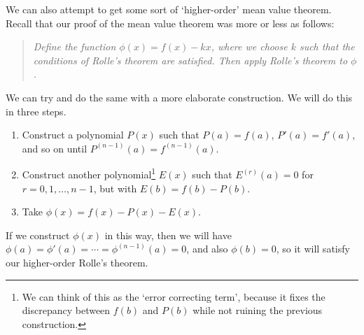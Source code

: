 \documentclass[a4paper]{scrartcl}
\begin{document}
We can also attempt to get some sort of `higher-order' mean value theorem. Recall that our proof of the mean value theorem was more or less as follows:
\begin{quotation}\noindent
	\emph{Define the function $\phi(x) = f(x) - kx$, where we choose $k$ such that the conditions of Rolle's theorem are satisfied.
	Then apply Rolle's theorem to $\phi$.}
\end{quotation}
We can try and do the same with a more elaborate construction. We will do this in three steps.
\begin{enumerate}
	\item Construct a polynomial $P(x)$ such that $P(a) = f(a)$, $P'(a) = f'(a)$, and so on until $P^{(n - 1)}(a) = f^{(n - 1)}(a)$.
	\item Construct another polynomial\footnote{We can think of this as the `error correcting term', because it fixes the discrepancy between $f(b)$ and $P(b)$ while not ruining the previous construction.} $E(x)$ such that $E^{(r)}(a) = 0$ for $r = 0, 1, \dots, n - 1$, but with $E(b) = f(b) - P(b)$.
	\item Take $\phi(x) = f(x) - P(x) - E(x)$.
\end{enumerate}
If we construct $\phi(x)$ in this way, then we will have $\phi(a) = \phi'(a) = \cdots = \phi^{(n - 1)}(a) = 0$, and also $\phi(b) = 0$, so it will satisfy our higher-order Rolle's theorem.
\end{document}
